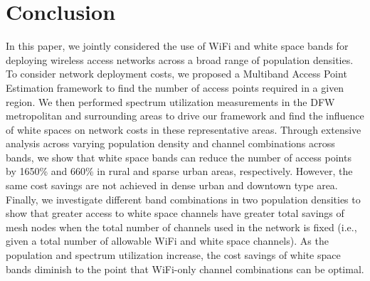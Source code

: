 \section{Conclusion}
\label{sec:conclusion}
In this paper, we jointly considered the use of WiFi and white space bands for 
deploying wireless access networks across a broad range of population densities.
To consider network deployment costs, we proposed a Multiband Access Point Estimation 
framework to find the number of access points required in a given region.
We then performed spectrum utilization measurements in the DFW metropolitan 
and surrounding areas to drive our framework and find the influence of white spaces on
network costs in these representative areas. Through 
extensive analysis across varying population density and channel combinations across bands, 
we show that white space bands can reduce the number of access points by 1650\%
and 660\% in rural and sparse urban areas, respectively. However, the same cost savings
are not achieved in dense urban and downtown type area. Finally, we investigate different 
band combinations in two population densities to show that greater access to white space 
channels have greater total savings of mesh nodes when the total number of channels used 
in the network is fixed (i.e., given a total number of allowable WiFi and white space channels). 
As the population and spectrum utilization increase, the cost savings of white space bands
diminish to the point that WiFi-only channel combinations can be optimal.



